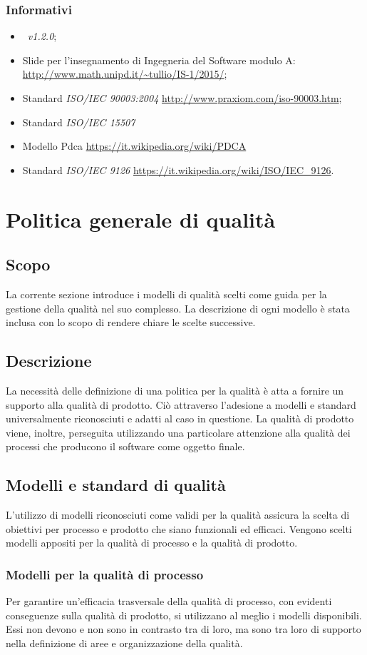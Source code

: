 \documentclass[12pt,a4paper]{article}
\begin{document}
\subsubsection{Informativi}
\begin{itemize}
	\item \PdP\ \textit{v1.2.0};
	\item Slide per l'insegnamento di Ingegneria del Software modulo A: \url{http://www.math.unipd.it/~tullio/IS-1/2015/};
	\item Standard \textit{ISO/IEC 90003:2004} \url{http://www.praxiom.com/iso-90003.htm};
	\item Standard \textit{ISO/IEC 15507} 
	\item Modello Pdca \url{https://it.wikipedia.org/wiki/PDCA}
	\item Standard \textit{ISO/IEC 9126} \url{https://it.wikipedia.org/wiki/ISO/IEC_9126}.
\end{itemize}
\newpage
\section{Politica generale di qualità}
\subsection{Scopo}
La corrente sezione introduce i modelli di qualità scelti come guida per la gestione della qualità nel suo complesso. La descrizione di ogni modello è stata inclusa con lo scopo di rendere chiare le scelte successive.
\subsection{Descrizione}
La necessità delle definizione di una politica per la qualità è atta a fornire un supporto alla qualità di prodotto. Ciò attraverso l'adesione a modelli e standard universalmente riconosciuti e adatti al caso in questione. La qualità di prodotto viene, inoltre, perseguita utilizzando una particolare attenzione alla qualità dei processi che producono il software come oggetto finale.
\subsection{Modelli e standard di qualità}
L'utilizzo di modelli riconosciuti come validi per la qualità assicura la scelta di obiettivi per processo e prodotto che siano funzionali ed efficaci. Vengono scelti modelli appositi per la qualità di processo e la qualità di prodotto.
\subsubsection{Modelli per la qualità di processo}
Per garantire un'efficacia trasversale della qualità di processo, con evidenti conseguenze sulla qualità di prodotto, si utilizzano al meglio i modelli disponibili. Essi non devono e non sono  in contrasto tra di loro, ma sono tra loro di supporto nella definizione di aree e organizzazione della qualità.
\end{document}
